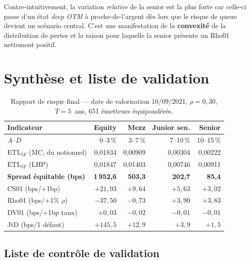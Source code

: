 \documentclass[11pt,a4paper]{article}
\newcommand{\ETL}{\mathrm{ETL}}
\begin{document}
\begin{calloutnote}[Insight]
Contre-intuitivement, la variation \emph{relative} de la senior est la plus forte
car celle-ci passe d'un état \emph{deep OTM} à proche-de-l'argent dès lors que le
risque de queue devient un scénario central. C'est une manifestation de la
\textbf{convexité} de la distribution de pertes et la raison pour laquelle la
senior présente un Rho01 nettement positif.
\end{calloutnote}

\section{Synthèse et liste de validation}\label{sec:summary}

\begin{table}[H]
\centering
\small
\begin{tabular}{lrrrr}
\toprule
\textbf{Indicateur} & \textbf{Equity} & \textbf{Mezz} & \textbf{Junior sen.} & \textbf{Senior} \\
\midrule
$A$--$D$                            & 0--3\,\% & 3--7\,\% & 7--10\,\% & 10--15\,\% \\
$\ETL_{5Y}$ (MC, du notionnel)      & 0,01834   & 0,00909   & 0,00304   & 0,00222   \\
$\ETL_{5Y}$ (LHP)                   & 0,01847   & 0,01403   & 0,00746   & 0,00911   \\
\textbf{Spread équitable (bps)}     & \textbf{1\,952,6} & \textbf{503,3} & \textbf{202,7} & \textbf{85,4} \\
CS01 (bps/+1bp)                     & $+21{,}93$ & $+9{,}64$ & $+5{,}63$ & $+3{,}02$ \\
Rho01 (bps/+1\% $\rho$)             & $-37{,}50$ & $-0{,}73$ & $+3{,}90$ & $+3{,}83$ \\
DV01 (bps/+1bp taux)                & $+0{,}03$  & $-0{,}02$ & $-0{,}01$ & $-0{,}01$ \\
JtD (bps/1 défaut)                  & $+145{,}5$ & $+12{,}9$ & $+3{,}9$  & $+1{,}5$  \\
\bottomrule
\end{tabular}
\caption{Rapport de risque final --- date de valorisation 10/09/2021,
$\rho = 0{,}30$, $T = 5$~ans, 651 émetteurs équipondérés.}
\end{table}

\subsection*{Liste de contrôle de validation}
\end{document}
